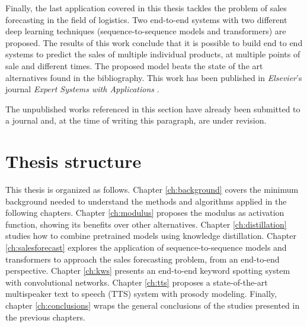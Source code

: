 Finally, the last application covered in this thesis tackles the problem of sales forecasting in the field of logistics. Two end-to-end systems with two different deep learning techniques (sequence-to-sequence models and transformers) are proposed. The results of this work conclude that it is possible to build end to end systems to predict the sales of multiple individual products, at multiple points of sale and different times. The proposed model beats the state of the art alternatives found in the bibliography. This work has been published in \textit{Elsevier}'s journal \textit{Expert Systems with Applications} \autocite{valles2021c}.

The unpublished works referenced in this section have already been submitted to a journal and, at the time of writing this paragraph, are under revision.

\section{Thesis structure}
This thesis is organized as follows. Chapter \ref{ch:background} covers the minimum background needed to understand the methods and algorithms applied in the following chapters. Chapter \ref{ch:modulus} proposes the modulus as activation function, showing its benefits over other alternatives. Chapter \ref{ch:distillation} studies how to combine pretrained models using knowledge distillation. Chapter \ref{ch:salesforecast} explores the application of sequence-to-sequence models and transformers to approach the sales forecasting problem, from an end-to-end perspective. Chapter \ref{ch:kws} presents an end-to-end keyword spotting system with convolutional networks. Chapter \ref{ch:tts} proposes a state-of-the-art multispeaker text to speech (TTS) system with prosody modeling. Finally, chapter \ref{ch:conclusions} wraps the general conclusions of the studies presented in the previous chapters.


